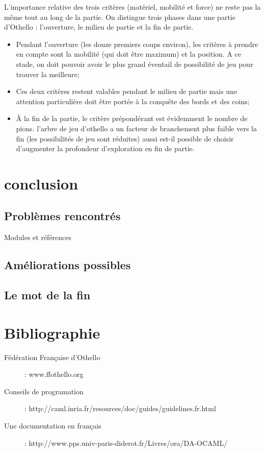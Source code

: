 \documentclass[10pt,a4paper]{report}
\begin{document}
L’importance relative des trois critères (matériel, mobilité et force) ne reste pas la même tout au long de la partie. On distingue trois phases dans une partie d’Othello : l’ouverture, le milieu de partie et la fin de partie.
\begin{itemize}
\item Pendant l’ouverture (les douze premiers coups environ), les critères à prendre en compte sont la mobilité (qui doit être maximum) et la position. A ce stade, on doit pouvoir avoir le plus grand éventail de possibilité de jeu pour trouver la meilleure;
\item Ces deux critères restent valables pendant le milieu de partie mais une attention particulière doit être portée à la conquête des bords et des coins;
\item À la fin de la partie, le critère prépondérant est évidemment le nombre de pions. l’arbre de jeu d’othello a un facteur de branchement plus faible vers la fin (les possibilités de jeu sont réduites) aussi est-il possible de choisir d’augmenter la profondeur d'exploration en fin de partie.
\end{itemize}


\chapter{conclusion}
\section{Problèmes rencontrés}
Modules et références

\section{Améliorations possibles}

\section{Le mot de la fin}

\chapter{Bibliographie}
\begin{description}
\item[Fédération Française d'Othello] : www.ffothello.org
\item[Conseils de programation] : http://caml.inria.fr/resources/doc/guides/guidelines.fr.html
\item[Une documentation en français] : http://www.pps.univ-paris-diderot.fr/Livres/ora/DA-OCAML/
\end{description}
\end{document}
